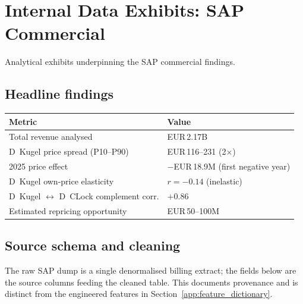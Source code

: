 \documentclass{article}
\begin{document}
\newpage

\section{Internal Data Exhibits: SAP Commercial}
\label{app:sap-exhibits}
Analytical exhibits underpinning the SAP commercial findings.


\subsection{Headline findings}
\label{app:sap-headline}
\small
\setlength{\tabcolsep}{4pt}
\renewcommand{\arraystretch}{1.15}
\begin{tabular}{@{}l l@{}}
\toprule
\textbf{Metric} & \textbf{Value} \\
\midrule
Total revenue analysed                 & EUR\,2.17B \\
D~Kugel price spread (P10--P90)        & EUR\,116--231 (2$\times$) \\
2025 price effect                      & $-$EUR\,18.9M (first negative year) \\
D~Kugel own-price elasticity           & $r=-0.14$ (inelastic) \\
D~Kugel $\leftrightarrow$ D~CLock complement corr. & $+0.86$ \\
Estimated repricing opportunity        & EUR\,50--100M \\
\bottomrule
\end{tabular}
\label{tab:sap-headline}
\normalsize



\subsection{Source schema and cleaning}
\label{app:sap-schema}
The raw SAP dump is a single denormalised billing extract; the fields below are the source
columns feeding the cleaned table. This documents provenance and is distinct from the
engineered features in Section~\ref{app:feature_dictionary}.\\[0.5em]
\end{document}
